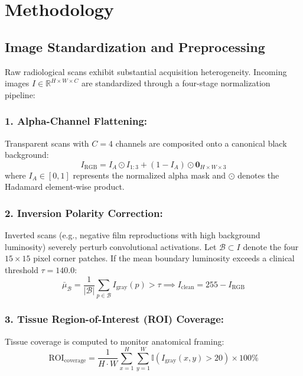 \documentclass[runningheads]{llncs}
\begin{document}
\section{Methodology}

\subsection{Image Standardization and Preprocessing}
Raw radiological scans exhibit substantial acquisition heterogeneity. Incoming images $I \in \mathbb{R}^{H \times W \times C}$ are standardized through a four-stage normalization pipeline:

\subsubsection{1. Alpha-Channel Flattening:}
Transparent scans with $C=4$ channels are composited onto a canonical black background:
\begin{equation}
I_{\text{RGB}} = I_{A} \odot I_{1:3} + (1 - I_{A}) \odot \mathbf{0}_{H \times W \times 3}
\end{equation}
where $I_A \in [0, 1]$ represents the normalized alpha mask and $\odot$ denotes the Hadamard element-wise product.

\subsubsection{2. Inversion Polarity Correction:}
Inverted scans (e.g., negative film reproductions with high background luminosity) severely perturb convolutional activations. Let $\mathcal{B} \subset I$ denote the four $15 \times 15$ pixel corner patches. If the mean boundary luminosity exceeds a clinical threshold $\tau = 140.0$:
\begin{equation}
\bar{\mu}_{\mathcal{B}} = \frac{1}{|\mathcal{B}|} \sum_{p \in \mathcal{B}} I_{\text{gray}}(p) > \tau \implies I_{\text{clean}} = 255 - I_{\text{RGB}}
\end{equation}

\subsubsection{3. Tissue Region-of-Interest (ROI) Coverage:}
Tissue coverage is computed to monitor anatomical framing:
\begin{equation}
\text{ROI}_{\text{coverage}} = \frac{1}{H \cdot W} \sum_{x=1}^{H} \sum_{y=1}^{W} \mathbb{I}\left(I_{\text{gray}}(x, y) > 20\right) \times 100\%
\end{equation}
\end{document}

